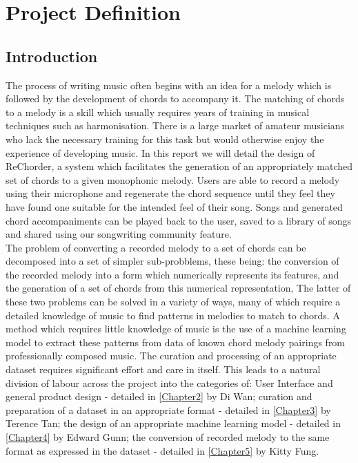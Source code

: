 
\chapter{Project Definition} %

\label{Chapter1} %

\section{Introduction}
The process of writing music often begins with an idea for a melody which is followed by the development of chords to accompany it.
The matching of chords to a melody is a skill which usually requires years of training in musical techniques such as harmonisation.
There is a large market of amateur musicians who lack the necessary training for this task but would otherwise enjoy the experience of developing music.  
In this report we will detail the design of ReChorder, a system which facilitates the generation of an appropriately matched set of chords to a given monophonic melody.
Users are able to record a melody using their microphone and regenerate the chord sequence until they feel they have found one suitable for the intended feel of their song.
Songs and generated chord accompaniments can be played back to the user, saved to a library of songs and shared using our songwriting community feature. \\
The problem of converting a recorded melody to a set of chords can be decomposed into a set of simpler sub-probblems, these being:
the conversion of the recorded melody into a form which numerically represents its features,
and the generation of a set of chords from this numerical representation,
The latter of these two problems can be solved in a variety of ways, many of which require a detailed knowledge of music to find patterns in melodies to match to chords.  
A method which requires little knowledge of music is the use of a machine learning model to extract these patterns from data of known chord melody pairings from professionally composed music. 
The curation and processing of an appropriate dataset requires significant effort and care in itself.
This leads to a natural division of labour across the project into the categories of:
\label{sec:Introduction}
User Interface and general product design - detailed in \ref{Chapter2} by Di Wan;
curation and preparation of a dataset in an appropriate format - detailed in \ref{Chapter3} by Terence Tan;
the design of an appropriate machine learning model - detailed in \ref{Chapter4} by Edward Gunn;
the conversion of recorded melody to the same format as expressed in the dataset - detailed in \ref{Chapter5} by Kitty Fung.


